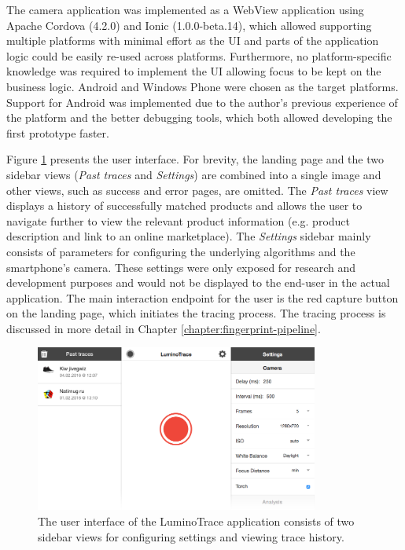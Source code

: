 \documentclass[thesis.tex]{subfiles}
\begin{document}
The camera application was implemented as a WebView application using Apache Cordova (4.2.0) and Ionic (1.0.0-beta.14), which allowed supporting multiple platforms with minimal effort as the UI and parts of the application logic could be easily re-used across platforms. Furthermore, no platform-specific knowledge was required to implement the UI allowing focus to be kept on the business logic. Android and Windows Phone were chosen as the target platforms. Support for Android was implemented due to the author's previous experience of the platform and the better debugging tools, which both allowed developing the first prototype faster.

Figure \ref{figure:user_interface} presents the user interface. For brevity, the landing page and the two sidebar views (\emph{Past traces} and \emph{Settings}) are combined into a single image and other views, such as success and error pages, are omitted. The \emph{Past traces} view displays a history of successfully matched products and allows the user to navigate further to view the relevant product information (e.g. product description and link to an online marketplace). The \emph{Settings} sidebar mainly consists of parameters for configuring the underlying algorithms and the smartphone's camera. These settings were only exposed for research and development purposes and would not be displayed to the end-user in the actual application. The main interaction endpoint for the user is the red capture button on the landing page, which initiates the tracing process. The tracing process is discussed in more detail in Chapter \ref{chapter:fingerprint-pipeline}.

\begin{figure}[h]
\centering \includegraphics[width=0.83\textwidth,height=\textheight,keepaspectratio=true]{images/design_implementation/user_interface}
\caption{The user interface of the LuminoTrace application consists of two sidebar views for configuring settings and viewing trace history. \label{figure:user_interface}}
\end{figure}
\end{document}
